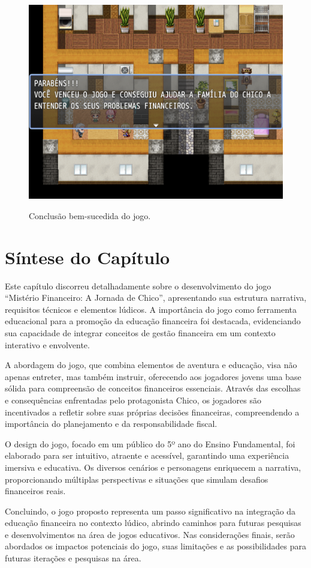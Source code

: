 \begin{figure}[!htbp]
	\centering
	\caption{Conclusão bem-sucedida do jogo.}
	\includegraphics[scale=0.4]{Textuais/Pictures/vitoria.png}
	\label{fig:vitoria}
\end{figure}



\section{Síntese do Capítulo}

Este capítulo discorreu detalhadamente sobre o desenvolvimento do jogo ``Mistério Financeiro: A Jornada de Chico'', apresentando sua estrutura narrativa, requisitos técnicos e elementos lúdicos. A importância do jogo como ferramenta educacional para a promoção da educação financeira foi destacada, evidenciando sua capacidade de integrar conceitos de gestão financeira em um contexto interativo e envolvente.

A abordagem do jogo, que combina elementos de aventura e educação, visa não apenas entreter, mas também instruir, oferecendo aos jogadores jovens uma base sólida para compreensão de conceitos financeiros essenciais. Através das escolhas e consequências enfrentadas pelo protagonista Chico, os jogadores são incentivados a refletir sobre suas próprias decisões financeiras, compreendendo a importância do planejamento e da responsabilidade fiscal.

O design do jogo, focado em um público do 5º ano do Ensino Fundamental, foi elaborado para ser intuitivo, atraente e acessível, garantindo uma experiência imersiva e educativa. Os diversos cenários e personagens enriquecem a narrativa, proporcionando múltiplas perspectivas e situações que simulam desafios financeiros reais.

Concluindo, o jogo proposto representa um passo significativo na integração da educação financeira no contexto lúdico, abrindo caminhos para futuras pesquisas e desenvolvimentos na área de jogos educativos. Nas considerações finais, serão abordados os impactos potenciais do jogo, suas limitações e as possibilidades para futuras iterações e pesquisas na área.
